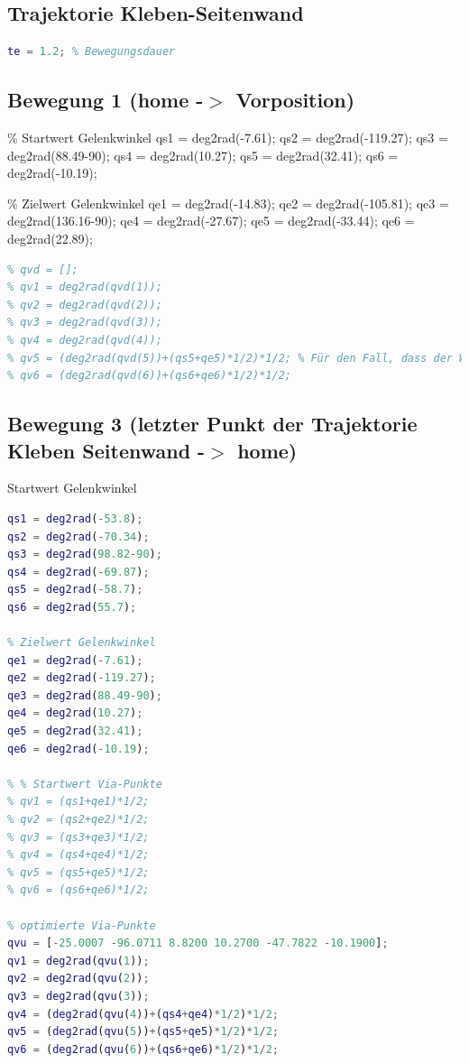 \subsection{Trajektorie Kleben-Seitenwand}
%
\begin{lstlisting}[language=Matlab, numbers=none]
te = 1.2; % Bewegungsdauer
\end{lstlisting}
%
\subsection{Bewegung 1 (home -\ensuremath{>} Vorposition)}
%
\begin{par}
	\% Startwert Gelenkwinkel qs1 = deg2rad(-7.61); qs2 = deg2rad(-119.27); qs3 = deg2rad(88.49-90); qs4 = deg2rad(10.27); qs5 = deg2rad(32.41); qs6 = deg2rad(-10.19);
\end{par} \vspace{1em}
\begin{par}
	\% Zielwert Gelenkwinkel qe1 = deg2rad(-14.83); qe2 = deg2rad(-105.81); qe3 = deg2rad(136.16-90); qe4 = deg2rad(-27.67); qe5 = deg2rad(-33.44); qe6 = deg2rad(22.89);
\end{par} \vspace{1em}
\begin{lstlisting}[language=Matlab, numbers=none]
% optimierte Via-Punkte
% qvd = [];
% qv1 = deg2rad(qvd(1));
% qv2 = deg2rad(qvd(2));
% qv3 = deg2rad(qvd(3));
% qv4 = deg2rad(qvd(4));
% qv5 = (deg2rad(qvd(5))+(qs5+qe5)*1/2)*1/2; % Für den Fall, dass der Wert zu dicht an den Grenzen liegt, was eine hohe Beschleunigung zur Folge hat, wird das Mittel aus dem optimierten und dem initialen Via-Punkt gebildet
% qv6 = (deg2rad(qvd(6))+(qs6+qe6)*1/2)*1/2;
\end{lstlisting}
%
\subsection{Bewegung 3 (letzter Punkt der Trajektorie Kleben Seitenwand -\ensuremath{>} home)}
%
\begin{par}
	Startwert Gelenkwinkel
\end{par} \vspace{1em}
\begin{lstlisting}[language=Matlab, numbers=none]
qs1 = deg2rad(-53.8);
qs2 = deg2rad(-70.34);
qs3 = deg2rad(98.82-90);
qs4 = deg2rad(-69.87);
qs5 = deg2rad(-58.7);
qs6 = deg2rad(55.7);

% Zielwert Gelenkwinkel
qe1 = deg2rad(-7.61);
qe2 = deg2rad(-119.27);
qe3 = deg2rad(88.49-90);
qe4 = deg2rad(10.27);
qe5 = deg2rad(32.41);
qe6 = deg2rad(-10.19);

% % Startwert Via-Punkte
% qv1 = (qs1+qe1)*1/2;
% qv2 = (qs2+qe2)*1/2;
% qv3 = (qs3+qe3)*1/2;
% qv4 = (qs4+qe4)*1/2;
% qv5 = (qs5+qe5)*1/2;
% qv6 = (qs6+qe6)*1/2;

% optimierte Via-Punkte
qvu = [-25.0007 -96.0711 8.8200 10.2700 -47.7822 -10.1900];
qv1 = deg2rad(qvu(1));
qv2 = deg2rad(qvu(2));
qv3 = deg2rad(qvu(3));
qv4 = (deg2rad(qvu(4))+(qs4+qe4)*1/2)*1/2;
qv5 = (deg2rad(qvu(5))+(qs5+qe5)*1/2)*1/2;
qv6 = (deg2rad(qvu(6))+(qs6+qe6)*1/2)*1/2;
\end{lstlisting}
%
